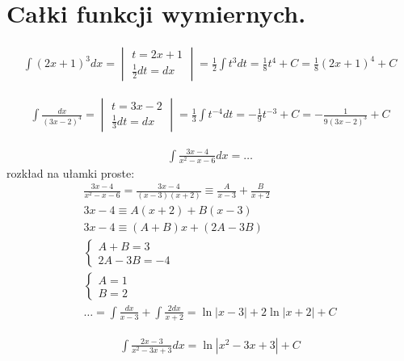 \section{Całki funkcji wymiernych.}


\begin{gather*}\int (2x+1)^3dx = \begin{vmatrix} t=2x+1 \\ \frac{1}{2}dt=dx \end{vmatrix} = \frac{1}{2}\int t^3 dt = \frac{1}{8}t^4+C = \frac{1}{8}(2x+1)^4+C\end{gather*}



\begin{gather*}\int \frac{dx}{(3x-2)^4} = \begin{vmatrix} t=3x-2 \\ \frac{1}{3}dt=dx \end{vmatrix} = \frac{1}{3} \int t^{-4}dt = -\frac{1}{9}t^{-3}+C = -\frac{1}{9(3x-2)^3}+C\end{gather*}



\begin{gather*}\int \frac{3x-4}{x^2-x-6}dx = \ldots\end{gather*}
rozkład na ułamki proste:
\begin{gather*}\frac{3x-4}{x^2-x-6} = \frac{3x-4}{(x-3)(x+2)} \equiv \frac{A}{x-3}+\frac{B}{x+2} \\
3x-4 \equiv A(x+2) + B(x-3) \\
3x-4 \equiv (A+B)x+(2A-3B) \\
\begin{cases} A+B=3 \\ 2A-3B=-4 \end{cases} \\
\begin{cases} A=1 \\ B=2 \end{cases} \\
\ldots = \int \frac{dx}{x-3} + \int \frac{2dx}{x+2} = \ln|x-3|+2\ln|x+2|+C\end{gather*}



\begin{gather*}\int \frac{2x-3}{x^2-3x+3}dx = \ln|x^2-3x+3|+C \end{gather*}

